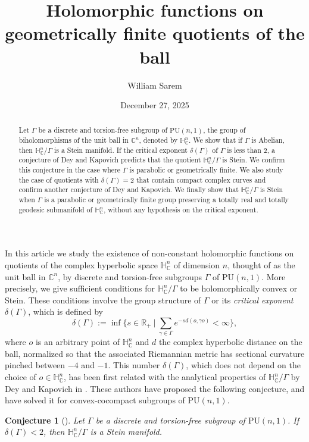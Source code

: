 \documentclass{article}
\title{Holomorphic functions on geometrically finite quotients of the ball}
\author{William Sarem}
\date{December 27, 2025}
\newtheorem*{conjecture*}{Conjecture}
\theoremstyle{definition}
\theoremstyle{remark}
\newcommand{\C}{\mathbb{C}}
\newcommand{\R}{\mathbb{R}}
\newcommand{\HNC}{\mathbb{H}^{n}_{\C}}
\newcommand{\PU}{\mathrm{PU}}
\begin{document}
 \maketitle 
	
	\begin{abstract}Let $\Gamma$ be a discrete and torsion-free subgroup of $\PU(n,1)$, the group of biholomorphisms of the unit ball in $\C^{n}$, denoted by $\HNC$. We show that if $\Gamma$ is Abelian, then $\HNC/\Gamma$ is a Stein manifold. If the critical exponent $\delta(\Gamma)$ of $\Gamma$ is less than 2, a conjecture of Dey and Kapovich predicts that the quotient $\HNC/\Gamma$ is Stein. We confirm this conjecture in the case where $\Gamma$ is parabolic or geometrically finite. We also study the case of quotients with $\delta(\Gamma)=2$ that contain compact complex curves and confirm another conjecture of Dey and Kapovich. We finally show that $\HNC/\Gamma$ is Stein when $\Gamma$ is a parabolic or geometrically finite group preserving a totally real and totally geodesic submanifold of $\HNC$, without any hypothesis on the critical exponent.
	\end{abstract}

	In this article we study the existence of non-constant holomorphic functions on quotients of the complex hyperbolic space $\HNC$ of dimension $n$, thought of as the unit ball in $\C^{n}$, by discrete and torsion-free subgroups $\Gamma$ of $\PU(n,1)$. More precisely, we give sufficient conditions for $\HNC/\Gamma$ to be holomorphically convex or Stein. These conditions involve the group structure of $\Gamma$ or its \textit{critical exponent} $\delta(\Gamma)$, which is defined by\begin{equation}\label{eq-def-delta}
		\delta(\Gamma) := \inf \{s \in \R_{+} \ \vert \ \sum_{\gamma \in \Gamma}e^{-sd(o,\gamma o)}< \infty\},
	\end{equation}
	where $o$ is an arbitrary point of $\HNC$ and $d$ the complex hyperbolic distance on the ball, normalized so that the associated Riemannian metric has sectional curvature pinched between $-4$ and $-1$. This number $\delta(\Gamma)$, which does not depend on the choice of $o\in \HNC$, has been first related with the analytical properties of $\HNC/\Gamma$ by Dey and Kapovich in \cite{deyNoteComplexhyperbolicKleinian2020}. These authors have proposed the following conjecture, and have solved it for convex-cocompact subgroups of $\PU(n,1)$.
	
	\begin{conjecture*}[{\cite{deyNoteComplexhyperbolicKleinian2020}}]
		Let $\Gamma$ be a discrete and torsion-free subgroup of $\PU(n,1)$. If $\delta(\Gamma)<2$, then $\HNC/\Gamma$ is a Stein manifold.
	\end{conjecture*}
	
\end{document}
